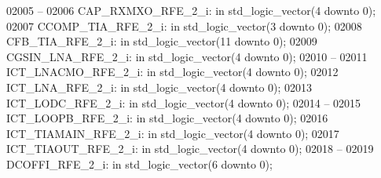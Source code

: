 \begin{DoxyCode}
02005 \textcolor{keyword}{    --}
02006     CAP\_RXMXO\_RFE\_2\_i:  \textcolor{keywordflow}{in} \textcolor{comment}{std\_logic\_vector}(\textcolor{vhdllogic}{}\textcolor{vhdllogic}{4} \textcolor{keywordflow}{downto} \textcolor{vhdllogic}{}\textcolor{vhdllogic}{0});
02007     CCOMP\_TIA\_RFE\_2\_i:  \textcolor{keywordflow}{in} \textcolor{comment}{std\_logic\_vector}(\textcolor{vhdllogic}{}\textcolor{vhdllogic}{3} \textcolor{keywordflow}{downto} \textcolor{vhdllogic}{}\textcolor{vhdllogic}{0});
02008     CFB\_TIA\_RFE\_2\_i:    \textcolor{keywordflow}{in} \textcolor{comment}{std\_logic\_vector}(\textcolor{vhdllogic}{}\textcolor{vhdllogic}{11} \textcolor{keywordflow}{downto} \textcolor{vhdllogic}{}\textcolor{vhdllogic}{0});
02009     CGSIN\_LNA\_RFE\_2\_i:  \textcolor{keywordflow}{in} \textcolor{comment}{std\_logic\_vector}(\textcolor{vhdllogic}{}\textcolor{vhdllogic}{4} \textcolor{keywordflow}{downto} \textcolor{vhdllogic}{}\textcolor{vhdllogic}{0});
02010 \textcolor{keyword}{    --}
02011     ICT\_LNACMO\_RFE\_2\_i: \textcolor{keywordflow}{in} \textcolor{comment}{std\_logic\_vector}(\textcolor{vhdllogic}{}\textcolor{vhdllogic}{4} \textcolor{keywordflow}{downto} \textcolor{vhdllogic}{}\textcolor{vhdllogic}{0});
02012     ICT\_LNA\_RFE\_2\_i:    \textcolor{keywordflow}{in} \textcolor{comment}{std\_logic\_vector}(\textcolor{vhdllogic}{}\textcolor{vhdllogic}{4} \textcolor{keywordflow}{downto} \textcolor{vhdllogic}{}\textcolor{vhdllogic}{0});
02013     ICT\_LODC\_RFE\_2\_i:   \textcolor{keywordflow}{in} \textcolor{comment}{std\_logic\_vector}(\textcolor{vhdllogic}{}\textcolor{vhdllogic}{4} \textcolor{keywordflow}{downto} \textcolor{vhdllogic}{}\textcolor{vhdllogic}{0});
02014 \textcolor{keyword}{    --}
02015     ICT\_LOOPB\_RFE\_2\_i:  \textcolor{keywordflow}{in} \textcolor{comment}{std\_logic\_vector}(\textcolor{vhdllogic}{}\textcolor{vhdllogic}{4} \textcolor{keywordflow}{downto} \textcolor{vhdllogic}{}\textcolor{vhdllogic}{0});
02016     ICT\_TIAMAIN\_RFE\_2\_i:    \textcolor{keywordflow}{in} \textcolor{comment}{std\_logic\_vector}(\textcolor{vhdllogic}{}\textcolor{vhdllogic}{4} \textcolor{keywordflow}{downto} \textcolor{vhdllogic}{}\textcolor{vhdllogic}{0});
02017     ICT\_TIAOUT\_RFE\_2\_i: \textcolor{keywordflow}{in} \textcolor{comment}{std\_logic\_vector}(\textcolor{vhdllogic}{}\textcolor{vhdllogic}{4} \textcolor{keywordflow}{downto} \textcolor{vhdllogic}{}\textcolor{vhdllogic}{0});
02018 \textcolor{keyword}{    --}
02019     DCOFFI\_RFE\_2\_i: \textcolor{keywordflow}{in} \textcolor{comment}{std\_logic\_vector}(\textcolor{vhdllogic}{}\textcolor{vhdllogic}{6} \textcolor{keywordflow}{downto} \textcolor{vhdllogic}{}\textcolor{vhdllogic}{0});

\end{DoxyCode}
